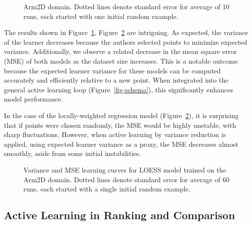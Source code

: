 \documentclass[
  letterpaper,
  numbers=noenddot,
  DIV=11]{scrreprt}
\theoremstyle{definition}
\theoremstyle{plain}
\theoremstyle{plain}
\theoremstyle{remark}
\begin{document}
\begin{figure}


\caption{\label{fig-empirical:gauss}Arm2D domain. Dotted lines denote
standard error for average of 10 runs, each started with one initial
random example.}

\end{figure}%

The results shown in
Figure~\ref{fig-empirical:gauss}, Figure~\ref{fig-empirical:regress} are
intriguing. As expected, the variance of the learner decreases because
the authors selected points to minimize expected variance. Additionally,
we observe a related decrease in the mean square error (MSE) of both
models as the dataset size increases. This is a notable outcome because
the expected learner variance for these models can be computed
accurately and efficiently relative to a new point. When integrated into
the general active learning loop (Figure~\ref{fig-schema}), this
significantly enhances model performance.

In the case of the locally-weighted regression model
(Figure~\ref{fig-empirical:regress}), it is surprising that if points
were chosen randomly, the MSE would be highly unstable, with sharp
fluctuations. However, when active learning by variance reduction is
applied, using expected learner variance as a proxy, the MSE decreases
almost smoothly, aside from some initial instabilities.

\begin{figure}


\caption{\label{fig-empirical:regress}Variance and MSE learning curves
for LOESS model trained on the Arm2D domain. Dotted lines denote
standard error for average of 60 runs, each started with a single
initial random example.}

\end{figure}%

\subsection{Active Learning in Ranking and
Comparison}\label{active-learning-in-ranking-and-comparison}
\end{document}
